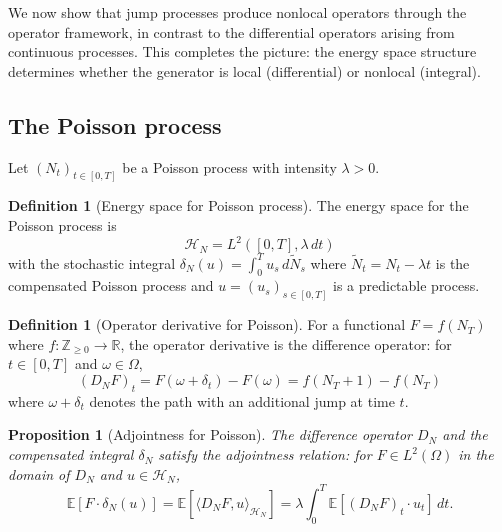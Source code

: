 \documentclass[12pt]{article}
\theoremstyle{plain}
\newtheorem{proposition}[theorem]{Proposition}
\theoremstyle{definition}
\newtheorem{definition}[theorem]{Definition}
\theoremstyle{remark}
\newcommand{\E}{\mathbb{E}}
\newcommand{\R}{\mathbb{R}}
\newcommand{\Z}{\mathbb{Z}}
\newcommand{\HH}{\mathcal{H}}
\begin{document}
We now show that jump processes produce nonlocal operators through the operator framework, in contrast to the differential operators arising from continuous processes. This completes the picture: the energy space structure determines whether the generator is local (differential) or nonlocal (integral).

\subsection{The Poisson process}

Let $(N_t)_{t \in [0,T]}$ be a Poisson process with intensity $\lambda > 0$.

\begin{definition}[Energy space for Poisson process]\label{def:Poisson-energy}
The energy space for the Poisson process is
\begin{equation}\label{eq:Poisson-energy}
\HH_N = L^2([0,T], \lambda \, dt)
\end{equation}
with the stochastic integral $\delta_N(u) = \int_0^T u_s \, d\tilde{N}_s$ where $\tilde{N}_t = N_t - \lambda t$ is the compensated Poisson process and $u = (u_s)_{s \in [0,T]}$ is a predictable process.
\end{definition}

\begin{definition}[Operator derivative for Poisson]\label{def:Poisson-derivative}
For a functional $F = f(N_T)$ where $f: \Z_{\geq 0} \to \R$, the operator derivative is the difference operator: for $t \in [0,T]$ and $\omega \in \Omega$,
\begin{equation}\label{eq:Poisson-derivative}
(D_N F)_t = F(\omega + \delta_t) - F(\omega) = f(N_T + 1) - f(N_T)
\end{equation}
where $\omega + \delta_t$ denotes the path with an additional jump at time $t$.
\end{definition}

\begin{proposition}[Adjointness for Poisson]\label{prop:Poisson-adjoint}
The difference operator $D_N$ and the compensated integral $\delta_N$ satisfy the adjointness relation: for $F \in L^2(\Omega)$ in the domain of $D_N$ and $u \in \HH_N$,
\begin{equation}\label{eq:Poisson-adjoint}
\E[F \cdot \delta_N(u)] = \E[\langle D_N F, u \rangle_{\HH_N}] = \lambda \int_0^T \E[(D_N F)_t \cdot u_t] \, dt.
\end{equation}
\end{proposition}
\end{document}
